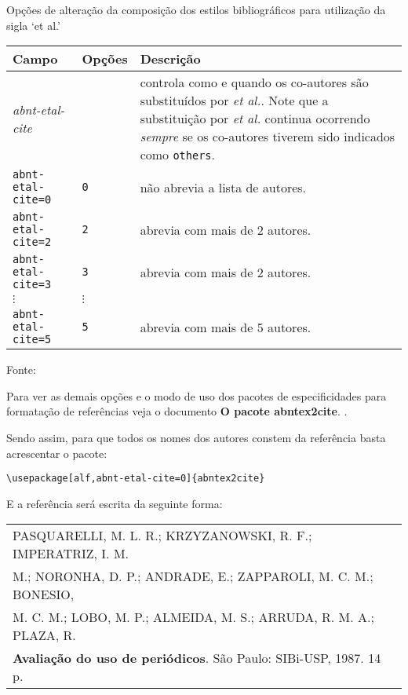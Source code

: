 \begin{quadro}[H]
	\caption{\label{quadro-opcoes-etal}Opções de alteração da composição dos estilos bibliográficos para utilização da sigla ‘et al.’}
		\begin{tabular}{|p{4.0cm}|p{2.0cm}|p{8.5cm}|}
			\hline
			\textbf{Campo} & \textbf{Opções} & \textbf{Descrição} \\ 
			\hline
			\emph{abnt-etal-cite} &  & controla como e quando os co-autores são
			substituídos por \emph{et al.}.  Note que a substituição
			por \emph{et al.} continua ocorrendo \emph{sempre} se os co-autores tiverem sido indicados
			como \texttt{others}.\\
			\hline
			\texttt{abnt-etal-cite=0}&\texttt{0}& não abrevia a lista de autores.\\
			\hline
			\texttt{abnt-etal-cite=2}& \texttt{2} & abrevia com mais de 2 autores.\\
			\hline
			\texttt{abnt-etal-cite=3}& \texttt{3} & abrevia com mais de 2 autores.\\
			\hline
			$\vdots$ & $\vdots$ & \\
			\hline
			\texttt{abnt-etal-cite=5}& \texttt{5} & abrevia com mais de 5 autores.\\
			\hline
		\end{tabular}
	\begin{flushleft}
		Fonte: 
	\end{flushleft}	
\end{quadro}

Para ver as demais opções e o modo de uso dos pacotes de especificidades para formatação de referências veja o documento \textbf{O pacote abntex2cite}. \cite{abnetxcite}.

Sendo assim, para que todos os nomes dos autores constem da referência basta acrescentar o pacote: 

\verb+\usepackage[alf,abnt-etal-cite=0]{abntex2cite}+

E a referência será escrita da seguinte forma: \\

\begin{tabular}{|l|c|} \hline
PASQUARELLI, M. L. R.; KRZYZANOWSKI, R. F.; IMPERATRIZ, I. M.\\
M.; NORONHA, D. P.; ANDRADE, E.; ZAPPAROLI, M. C. M.; BONESIO, \\
M. C. M.; LOBO, M. P.; ALMEIDA, M. S.; ARRUDA, R. M. A.; PLAZA, R. \\ \textbf{Avaliação do uso de periódicos}. São Paulo: SIBi-USP, 1987. 14 p.\\\hline
\end{tabular}\\

